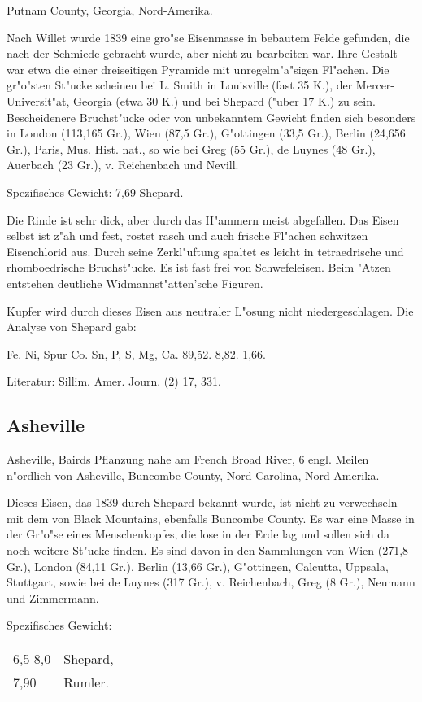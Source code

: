 \documentclass[a4paper, 11pt, oneside]{article}
\begin{document}
Putnam County, Georgia, Nord-Amerika.

Nach Willet wurde 1839 eine gro"se Eisenmasse in bebautem Felde gefunden, die nach der Schmiede gebracht wurde, aber nicht zu bearbeiten war. Ihre Gestalt war etwa die einer dreiseitigen Pyramide mit unregelm"a"sigen Fl"achen. Die gr"o"sten St"ucke scheinen bei L. Smith in Louisville (fast 35 K.), der Mercer-Universit"at, Georgia (etwa 30 K.) und bei Shepard ("uber 17 K.) zu sein. Bescheidenere Bruchst"ucke oder von unbekanntem Gewicht finden sich besonders in London (113,165 Gr.), Wien (87,5 Gr.), G"ottingen (33,5 Gr.), Berlin (24,656 Gr.), Paris, Mus. Hist. nat., so wie bei Greg (55 Gr.), de Luynes (48 Gr.), Auerbach (23 Gr.), v. Reichenbach und Nevill.

Spezifisches Gewicht: 7,69 Shepard.

Die Rinde ist sehr dick, aber durch das H"ammern meist abgefallen. Das Eisen selbst ist z"ah und fest, rostet rasch und auch frische Fl"achen schwitzen Eisenchlorid aus. Durch seine Zerkl"uftung spaltet es leicht in tetraedrische und rhomboedrische Bruchst"ucke. Es ist fast frei von Schwefeleisen. Beim "Atzen entstehen deutliche Widmannst"atten'sche Figuren.

Kupfer wird durch dieses Eisen aus neutraler L"osung nicht niedergeschlagen. Die Analyse von Shepard gab:

Fe. Ni, Spur Co. Sn, P, S, Mg, Ca.  
89,52. 8,82. 1,66.

Literatur: Sillim. Amer. Journ. (2) 17, 331.

\subsection{Asheville}

Asheville, Bairds Pflanzung nahe am French Broad River, 6 engl. Meilen n"ordlich von Asheville, Buncombe County, Nord-Carolina, Nord-Amerika.

Dieses Eisen, das 1839 durch Shepard bekannt wurde, ist nicht zu verwechseln mit dem von Black Mountains, ebenfalls Buncombe County. Es war eine Masse in der Gr"o"se eines Menschenkopfes, die lose in der Erde lag und sollen sich da noch weitere St"ucke finden. Es sind davon in den Sammlungen von Wien (271,8 Gr.), London (84,11 Gr.), Berlin (13,66 Gr.), G"ottingen, Calcutta, Uppsala, Stuttgart, sowie bei de Luynes (317 Gr.), v. Reichenbach, Greg (8 Gr.), Neumann und Zimmermann.

Spezifisches Gewicht:  
\begin{table}[!ht]
    \centering
    \begin{tabular}{l l}
        6,5-8,0 & Shepard,\\
        7,90 & Rumler.
    \end{tabular}
\end{table}
\end{document}
